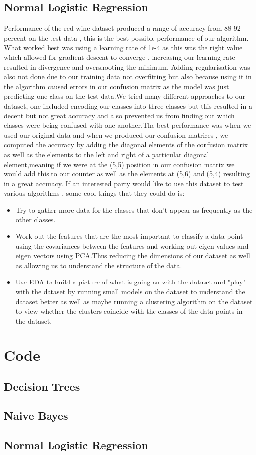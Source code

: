 \documentclass{article}
\begin{document}
\subsection{Normal Logistic Regression}
Performance of the red wine dataset produced a range of accuracy from 88-92 percent on the test data , this is the best possible performance of our algorithm.
What worked best was using a learning rate of 1e-4 as this was the right value which allowed for gradient descent to converge , increasing our learning rate resulted in divergence and overshooting the minimum. Adding regularisation was also not done due to our training data not overfitting but also because using it in the algorithm caused errors in our confusion matrix as the model was just predicting one class on the test data.We tried many different approaches to our dataset, one included encoding our classes into three classes but this resulted in a decent but not great accuracy and also prevented us from finding out which classes were being confused with one another.The best performance was when we used our original data and when we produced our confusion matrices , we computed the accuracy by adding the diagonal elements of the confusion matrix as well as the elements to the left and right of a particular diagonal element,meaning if we were at the (5,5) position in our confusion matrix we would add this to our counter as well as the elements at (5,6) and (5,4) resulting in a great accuracy.
If an interested party would like to use this dataset to test various algorithms , some cool things that they could do is:
\begin{itemize}
    \item Try to gather more data for the classes that don't appear as frequently as the other classes.
    \item Work out the features that are the most important to classify a data point using the covariances between the features and working out eigen values and eigen vectors using PCA.Thus reducing the dimensions of our dataset as well as allowing us to understand the structure of the data.
    \item Use EDA to build a picture of what is going on with the dataset and "play" with the dataset by running small models on the dataset to understand the dataset better as well as maybe running a clustering algorithm on the dataset to view whether the clusters coincide with the classes of the data points in the dataset.
\end{itemize}


\section{Code}
\subsection{Decision Trees}
\subsection{Naive Bayes}
\subsection{Normal Logistic Regression}
\end{document}
